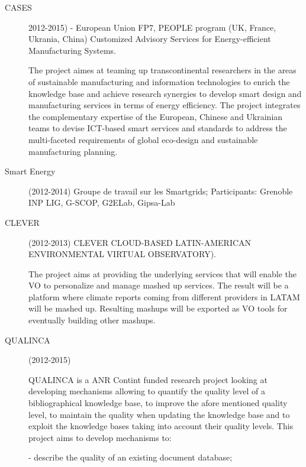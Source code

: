 \begin{description}
\item[CASES]  2012-2015) - European Union FP7, PEOPLE program (UK, France, Ukrania, China)
Customized Advisory Services for Energy-efficient Manufacturing Systems.   

The project aimes at teaming up transcontinental researchers in the areas of sustainable manufacturing and information technologies to enrich the knowledge base and achieve research synergies to develop smart design and manufacturing services in terms of energy efficiency. The project 
 integrates the complementary expertise of the European, Chinese and Ukrainian teams to devise ICT-based smart services and standards to address the multi-faceted requirements of global eco-design and sustainable manufacturing planning.



\item[Smart Energy] (2012-2014) Groupe de travail sur les Smartgrids; Participants: Grenoble INP LIG, G-SCOP, G2ELab, Gipsa-Lab

\item[CLEVER] (2012-2013)  CLEVER CLOUD-BASED LATIN-AMERICAN ENVIRONMENTAL VIRTUAL OBSERVATORY). 

The project aims at providing the underlying services that will enable the VO to personalize and manage mashed up services. The result will be a platform where climate reports coming from different providers in LATAM will be mashed up. Resulting mashups will be exported as VO tools for eventually building other mashups.

\item[QUALINCA] (2012-2015)

QUALINCA is a ANR Contint funded research project looking at developing mechanisms allowing to quantify the quality level of a bibliographical knowledge base, to improve the afore mentioned quality level, to maintain the quality when updating the knowledge base and to exploit the knowledge bases taking into account their quality levels.
This project aims to develop mechanisms to:

- describe the quality of an existing document database;


\end{description}
